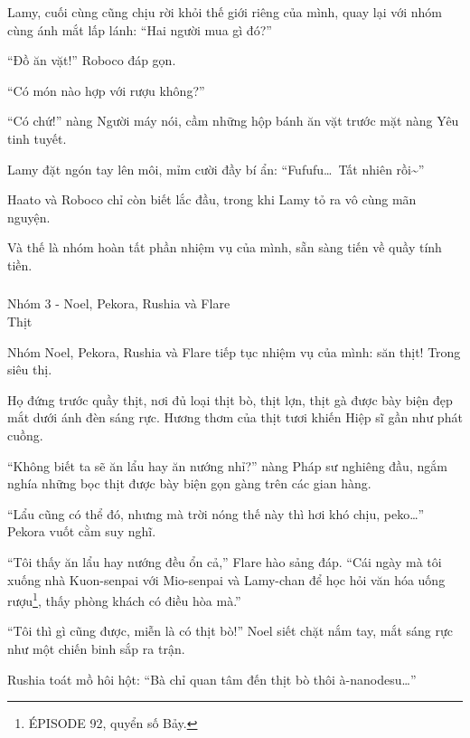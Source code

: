 \documentclass[../main.tex]{subfiles}
\begin{document}
Lamy, cuối cùng cũng chịu rời khỏi thế giới riêng của mình, quay lại với nhóm cùng ánh mắt lấp lánh: ``Hai người mua gì đó?''

``Đồ ăn vặt!'' Roboco đáp gọn.

``Có món nào hợp với rượu không?''

``Có chứ!'' nàng Người máy nói, cầm những hộp bánh ăn vặt trước mặt nàng Yêu tinh tuyết.

Lamy đặt ngón tay lên môi, mỉm cười đầy bí ẩn: ``Fufufu\dots\ Tất nhiên rồi\~{}''

Haato và Roboco chỉ còn biết lắc đầu, trong khi Lamy tỏ ra vô cùng mãn nguyện.

Và thế là nhóm hoàn tất phần nhiệm vụ của mình, sẵn sàng tiến về quầy tính tiền.

\vspace{-40pt}
\subsubsection*{\label{P1.1c}}

\begin{center}
    {\color{T3} Nhóm 3 - Noel, Pekora, Rushia và Flare \\Thịt}
\end{center}

Nhóm Noel, Pekora, Rushia và Flare tiếp tục nhiệm vụ của mình: săn thịt! Trong siêu thị.

Họ đứng trước quầy thịt, nơi đủ loại thịt bò, thịt lợn, thịt gà được bày biện đẹp mắt dưới ánh đèn sáng rực. Hương thơm của thịt tươi khiến Hiệp sĩ gần như phát cuồng.

``Không biết ta sẽ ăn lẩu hay ăn nướng nhỉ?'' nàng Pháp sư nghiêng đầu, ngắm nghía những bọc thịt được bày biện gọn gàng trên các gian hàng.

``Lẩu cũng có thể đó, nhưng mà trời nóng thế này thì hơi khó chịu, peko\dots'' Pekora vuốt cằm suy nghĩ.

``Tôi thấy ăn lẩu hay nướng đều ổn cả,'' Flare hào sảng đáp. ``Cái ngày mà tôi xuống nhà Kuon-senpai với Mio-senpai và Lamy-chan để học hỏi văn hóa uống rượu\footnote{{\flaregothic ÉPISODE 92}, quyển số Bảy.}, thấy phòng khách có điều hòa mà.''

``Tôi thì gì cũng được, miễn là có thịt bò!'' Noel siết chặt nắm tay, mắt sáng rực như một chiến binh sắp ra trận.

Rushia toát mồ hôi hột: ``Bà chỉ quan tâm đến thịt bò thôi à-nanodesu\dots''
\end{document}
